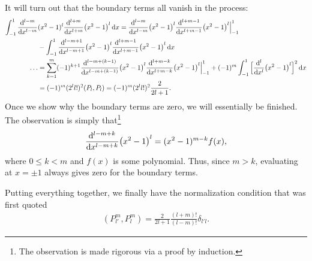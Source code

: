 It will turn out that the boundary terms all vanish in the process:
\begin{align}
    \int_{-1}^{1} \dv[l-m]{x} &(x^2-1)^{l} \dv[l+m]{x} (x^2 - 1)^{l} \dd{x} = \dv[l-m]{x} (x^2 - 1)^{l} \dv[l+m-1]{x} (x^2-1)^{l} \Big|_{-1}^{1} \nonumber \\
                                                                           &- \int_{-1}^{1} \dv[l-m+1]{x} (x^2 - 1)^{l} \dv[l+m-1]{x} (x^2 - 1)^{l} \dd{x} \nonumber \\
    \ldots &= \sum_{k=1}^{m} (-1)^{k+1} \dv[l-m+(k-1)]{x} (x^2 - 1)^{l} \dv[l+m-k]{x} (x^2-1)^{l}\Big|_{-1}^{1} + (-1)^{m} \int_{-1}^{1} \Big[ \dv[l]{x} (x^2-1)^{l} \Big]^2 \dd{x} \nonumber \\
           &= (-1)^{m} (2^{l} l!)^2 (P_{l},P_{l}) = (-1)^{m} (2^{l} l!)^{2} \frac{2}{2l+1}
.\end{align}
Once we show why the boundary terms are zero, we will essentially be finished.
The observation is simply that\footnote{The observation is made rigorous via a proof by induction.}
\begin{eqnarray}
    \dv[l-m+k]{x} (x^2 - 1)^{l} = (x^2 - 1)^{m-k} f(x)
,\end{eqnarray}
where $0 \leq k < m$ and $f(x)$ is some polynomial.
Thus, since $m > k$, evaluating at $x = \pm 1$ always gives zero for the boundary terms.

Putting everything together, we finally have the normalization condition that was first quoted
\begin{eqnarray}
    (P_{l'}^{m},P_{l}^{m}) = \frac{2}{2l+1} \frac{(l+m)!}{(l-m)!} \delta_{l'l}
.\end{eqnarray}







